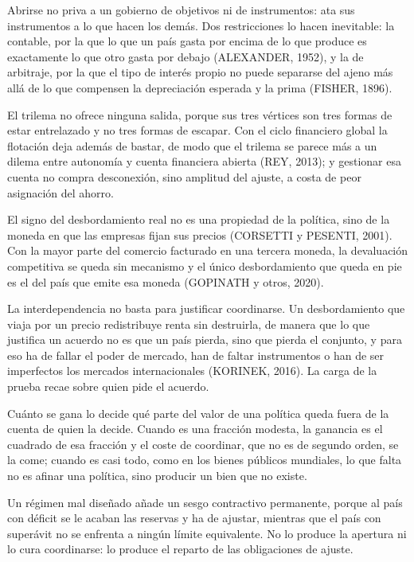 \documentclass[10pt,a4paper]{article}
\newcommand{\puntosclave}[1]{%
  \begin{tcolorbox}[
    colframe=black,
    title={Puntos clave},
    before upper={\setlength{\parindent}{0.5cm}\setlength{\parskip}{0.5\baselineskip}}
  ]
  #1
  \end{tcolorbox}
}
\begin{document}
\puntosclave{
    Abrirse no priva a un gobierno de objetivos ni de instrumentos: ata sus instrumentos a lo que hacen los demás. Dos restricciones lo hacen inevitable: la contable, por la que lo que un país gasta por encima de lo que produce es exactamente lo que otro gasta por debajo (ALEXANDER, 1952), y la de arbitraje, por la que el tipo de interés propio no puede separarse del ajeno más allá de lo que compensen la depreciación esperada y la prima (FISHER, 1896).

    El trilema no ofrece ninguna salida, porque sus tres vértices son tres formas de estar entrelazado y no tres formas de escapar. Con el ciclo financiero global la flotación deja además de bastar, de modo que el trilema se parece más a un dilema entre autonomía y cuenta financiera abierta (REY, 2013); y gestionar esa cuenta no compra desconexión, sino amplitud del ajuste, a costa de peor asignación del ahorro.

    El signo del desbordamiento real no es una propiedad de la política, sino de la moneda en que las empresas fijan sus precios (CORSETTI y PESENTI, 2001). Con la mayor parte del comercio facturado en una tercera moneda, la devaluación competitiva se queda sin mecanismo y el único desbordamiento que queda en pie es el del país que emite esa moneda (GOPINATH y otros, 2020).

    La interdependencia no basta para justificar coordinarse. Un desbordamiento que viaja por un precio redistribuye renta sin destruirla, de manera que lo que justifica un acuerdo no es que un país pierda, sino que pierda el conjunto, y para eso ha de fallar el poder de mercado, han de faltar instrumentos o han de ser imperfectos los mercados internacionales (KORINEK, 2016). La carga de la prueba recae sobre quien pide el acuerdo.

    Cuánto se gana lo decide qué parte del valor de una política queda fuera de la cuenta de quien la decide. Cuando es una fracción modesta, la ganancia es el cuadrado de esa fracción y el coste de coordinar, que no es de segundo orden, se la come; cuando es casi todo, como en los bienes públicos mundiales, lo que falta no es afinar una política, sino producir un bien que no existe.

    Un régimen mal diseñado añade un sesgo contractivo permanente, porque al país con déficit se le acaban las reservas y ha de ajustar, mientras que el país con superávit no se enfrenta a ningún límite equivalente. No lo produce la apertura ni lo cura coordinarse: lo produce el reparto de las obligaciones de ajuste.
}
\end{document}
